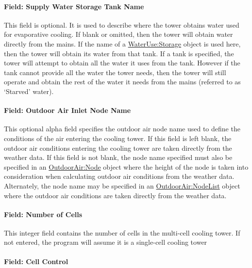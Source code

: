 \paragraph{Field: Supply Water Storage Tank Name}\label{field-supply-water-storage-tank-name-2}

This field is optional. It is used to describe where the tower obtains water used for evaporative cooling. If blank or omitted, then the tower will obtain water directly from the mains. If the name of a \hyperref[waterusestorage]{WaterUse:Storage} object is used here, then the tower will obtain its water from that tank. If a tank is specified, the tower will attempt to obtain all the water it uses from the tank. However if the tank cannot provide all the water the tower needs, then the tower will still operate and obtain the rest of the water it needs from the mains (referred to as `Starved' water).

\paragraph{Field: Outdoor Air Inlet Node Name}\label{field-outdoor-air-inlet-node-name-2}

This optional alpha field specifies the outdoor air node name used to define the conditions of the air entering the cooling tower. If this field is left blank, the outdoor air conditions entering the cooling tower are taken directly from the weather data. If this field is not blank, the node name specified must also be specified in an \hyperref[outdoorairnode]{OutdoorAir:Node} object where the height of the node is taken into consideration when calculating outdoor air conditions from the weather data. Alternately, the node name may be specified in an \hyperref[outdoorairnodelist]{OutdoorAir:NodeList} object where the outdoor air conditions are taken directly from the weather data.

\paragraph{Field: Number of Cells}\label{field-number-of-cells-2}

This integer field contains the number of cells in the multi-cell cooling tower. If not entered, the program will assume it is a single-cell cooling tower

\paragraph{Field: Cell Control}\label{field-cell-control-2}

